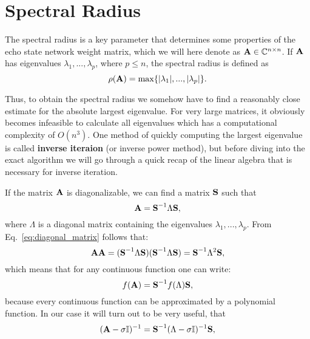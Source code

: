\section{Spectral Radius}
\label{sec:spectral_radius}

The spectral radius is a key parameter that determines some properties of the 
echo state network weight matrix, which we will here denote as
$\boldsymbol{\textbf{A}} \in \mathbb{C} ^{n\times n}$.
If $\boldsymbol{\textbf{A}}$ has eigenvalues $\lambda_1, ... , \lambda_p$, where $p \leq n$,
the spectral radius is defined as
\begin{equation}
  \rho(\boldsymbol{\textbf{A}}) = \max \{|\lambda_1|,...,|\lambda_p|\}.
\end{equation}

Thus, to obtain the spectral radius we somehow have to find a reasonably close estimate
for the absolute largest eigenvalue.
For very large matrices, it obviously becomes infeasible to calculate all eigenvalues
which has a computational complexity of $O(n^3)$.
One method of quickly computing the largest eigenvalue is called \textbf{inverse iteraion}
(or inverse power method), but before diving into the exact algorithm we will go
through a quick recap of the linear algebra that is necessary for inverse iteration.

If the matrix $\boldsymbol{\textbf{A}}$ is diagonalizable, we can find a matrix $\boldsymbol{\textbf{S}}$ such that
\begin{equation}
  \label{eq:diagonal_matrix}
  \boldsymbol{\textbf{A}} = \boldsymbol{\textbf{S}}^{-1} {\Lambda} \boldsymbol{\textbf{S}},
\end{equation}
where $\Lambda$ is a diagonal matrix containing the eigenvalues
$\lambda_1,...,\lambda_p$.
From Eq.~\ref{eq:diagonal_matrix} follows that:
\begin{equation}
  \label{eq:matrix_power}
  \boldsymbol{\textbf{A}} \boldsymbol{\textbf{A}} = (\boldsymbol{\textbf{S}}^{-1}\Lambda\boldsymbol{\textbf{S}})(\boldsymbol{\textbf{S}}^{-1}\Lambda\boldsymbol{\textbf{S}})
                    = \boldsymbol{\textbf{S}}^{-1}\Lambda^2\boldsymbol{\textbf{S}},
\end{equation}
which means that for any continuous function one can write:
\begin{equation}
  f(\boldsymbol{\textbf{A}}) = \boldsymbol{\textbf{S}}^{-1} f(\Lambda) \boldsymbol{\textbf{S}},
\end{equation}
because every continuous function can be approximated by a polynomial function.
In our case it will turn out to be very useful, that
\begin{equation}
  \label{eq:inverse_ev}
  (\boldsymbol{\textbf{A}} - \sigma \mathbb{I})^{-1} =
        \boldsymbol{\textbf{S}}^{-1} (\Lambda - \sigma \mathbb{I})^{-1} \boldsymbol{\textbf{S}},
\end{equation}

